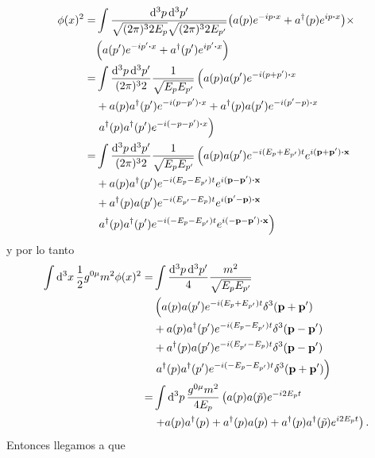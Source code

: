 \documentclass{article}
\begin{document}
\begin{align}
\begin{split}
\phi(x)^2=&\int\frac{\dd[3]{p}\dd[3]{p'}}{\sqrt{(2\pi)^32E_{p}}\sqrt{(2\pi)^32E_{p'}}}\qty(a(p)e^{-ip\vdot x}+a^\dagger(p)e^{ip\vdot x})\times\\
&\qty(a(p')e^{-ip'\vdot x}+ a^\dagger(p')e^{ip'\vdot x})\\
=&\int\frac{\dd[3]{p}\dd[3]{p'}}{(2\pi)^32}\frac{1}{\sqrt{E_pE_{p'}}}\left(a(p)a(p')e^{-i(p+p')\vdot x}\right.\\
&+a(p)a^\dagger(p')e^{-i(p-p')\vdot x}+a^\dagger(p)a(p')e^{-i(p'-p)\vdot x}\\
&\left.a^\dagger(p)a^\dagger(p')e^{-i(-p-p')\vdot x}\right)\\
=&\int\frac{\dd[3]{p}\dd[3]{p'}}{(2\pi)^32}\frac{1}{\sqrt{E_pE_{p'}}}\left(a(p)a(p')e^{-i(E_p+E_{p'})t}e^{i(\vb{p}+\vb{p'})\vdot\vb{x}}\right.\\
&+a(p)a^\dagger(p')e^{-i(E_p-E_{p'})t}e^{i(\vb{p}-\vb{p'})\vdot\vb{x}}\\
&+a^\dagger(p)a(p')e^{-i(E_{p'}-E_p)t}e^{i(\vb{p'}-\vb{p})\vdot\vb{x}}\\
&\left.a^\dagger(p)a^\dagger(p')e^{-i(-E_p-E_{p'})t}e^{i(-\vb{p}-\vb{p'})\vdot\vb{x}}\right)
\end{split}
\end{align}
y por lo tanto
\begin{align}
\begin{split}
\int\dd[3]{x}\frac{1}{2}g^{0\mu}m^2\phi(x)^2=&\int\frac{\dd[3]{p}\dd[3]{p'}}{4}\frac{m^2}{\sqrt{E_pE_{p'}}}\\
&\left(a(p)a(p')e^{-i(E_p+E_{p'})t}\delta^3(\vb{p}+\vb{p'})\right.\\
&+a(p)a^\dagger(p')e^{-i(E_p-E_{p'})t}\delta^3(\vb{p}-\vb{p'})\\
&+a^\dagger(p)a(p')e^{-i(E_{p'}-E_p)t}\delta^3(\vb{p}-\vb{p'})\\
&\left.a^\dagger(p)a^\dagger(p')e^{-i(-E_p-E_{p'})t}\delta^3(\vb{p}+\vb{p'})\right)\\
=&\int\dd[3]{p}\frac{g^{0\mu}m^2}{4E_p}\left(a(p)a(\tilde{p})e^{-i2E_pt}\right.\\
&\left.+a(p)a^\dagger(p)+a^\dagger(p)a(p)+a^\dagger(p)a^\dagger(\tilde{p})e^{i2E_pt}\right).
\end{split}
\end{align}
Entonces llegamos a que
\end{document}
